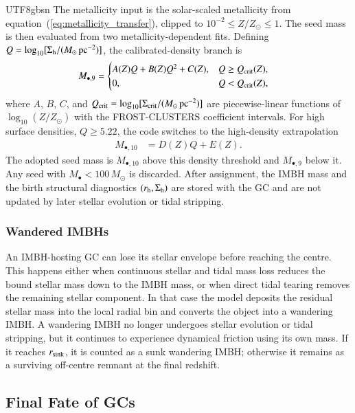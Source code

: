 \documentclass[trackchanges, twocolappendix, twocolumn]{aastex701}
\begin{document}
\begin{CJK*}{UTF8}{gbsn}
The metallicity input is the solar-scaled metallicity from equation~(\ref{eq:metallicity_transfer}), clipped to $10^{-2} \le Z / Z_{\odot} \le 1$. The seed mass is then evaluated from two metallicity-dependent fits. Defining $Q = \log_{10}[\Sigma_{\rm h} / (M_\odot\,{\rm pc}^{-2})]$, the calibrated-density branch is
\begin{align}
M_{\bullet,9} & =
\begin{cases}
A(Z) Q + B(Z) Q^2 + C(Z), & Q \ge Q_{\rm crit}(Z),\\
0, & Q < Q_{\rm crit}(Z),
\end{cases}
\end{align}
where $A$, $B$, $C$, and $Q_{\rm crit} = \log_{10}[\Sigma_{\rm crit} / (M_\odot\,{\rm pc}^{-2})]$ are piecewise-linear functions of $\log_{10}(Z / Z_{\odot})$ with the FROST-CLUSTERS coefficient intervals. For high surface densities, $Q \ge 5.22$, the code switches to the high-density extrapolation
\begin{align}
M_{\bullet,10} & = D(Z) Q + E(Z).
\end{align}
The adopted seed mass is $M_{\bullet,10}$ above this density threshold and $M_{\bullet,9}$ below it. Any seed with $M_{\bullet} < 100\,M_\odot$ is discarded. After assignment, the IMBH mass and the birth structural diagnostics $(r_{\rm h}, \Sigma_{\rm h})$ are stored with the GC and are not updated by later stellar evolution or tidal stripping.

\subsubsection{Wandered IMBHs} \label{subsubsect:wandered_imbh}

An IMBH-hosting GC can lose its stellar envelope before reaching the centre. This happens either when continuous stellar and tidal mass loss reduces the bound stellar mass down to the IMBH mass, or when direct tidal tearing removes the remaining stellar component. In that case the model deposits the residual stellar mass into the local radial bin and converts the object into a wandering IMBH\@. A wandering IMBH no longer undergoes stellar evolution or tidal stripping, but it continues to experience dynamical friction using its own mass. If it reaches $r_{\rm sink}$, it is counted as a sunk wandering IMBH; otherwise it remains as a surviving off-centre remnant at the final redshift.

\subsection{Final Fate of GCs} \label{subsect:stat}


\end{CJK*}
\end{document}
